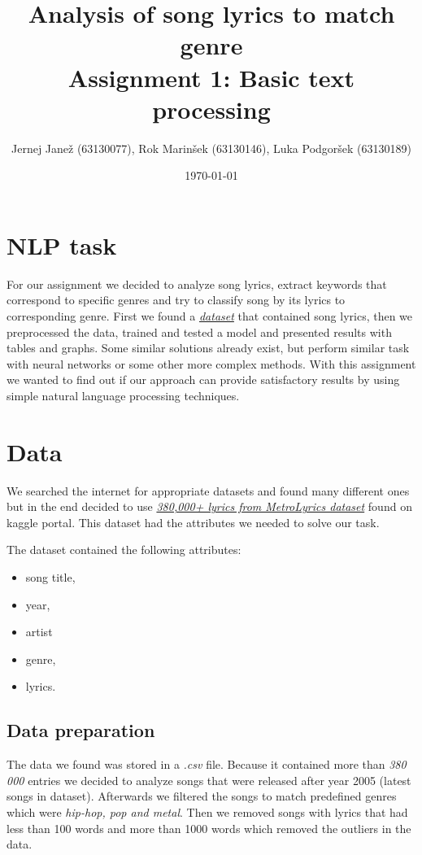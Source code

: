 \documentclass[a4paper,11pt]{article}
\title{%
Analysis of song lyrics to match genre \\
\large Assignment 1: Basic text processing}
\author{Jernej Janež (63130077), Rok Marinšek (63130146), Luka Podgoršek (63130189)}
\date{\today}
\begin{document}
\maketitle

\section{NLP task}
For our assignment we decided to analyze song lyrics, extract keywords that correspond to specific genres and try to classify song by its lyrics to corresponding genre. First we found a \href{https://www.kaggle.com/gyani95/380000-lyrics-from-metrolyrics}{\textit{dataset}} that contained song lyrics, then we preprocessed the data, trained and tested a model and presented results with tables and graphs. Some similar solutions already exist, but perform similar task with neural networks or some other more complex methods. With this assignment we wanted to find out if our approach can provide satisfactory results by using simple natural language processing techniques.

\section{Data}
We searched the internet for appropriate datasets and found many different ones but in the end decided to use \href{https://www.kaggle.com/gyani95/380000-lyrics-from-metrolyrics}{\textit{380,000+ lyrics from MetroLyrics dataset}} found on kaggle portal. This dataset had the attributes we needed to solve our task.

\noindent The dataset contained the following attributes:
\begin{itemize}
\item song title,
\item year,
\item artist
\item genre,
\item lyrics.
\end{itemize}

\subsection{Data preparation}
The data we found was stored in a \textit{.csv} file. Because it contained more than \textit{380 000} entries we decided to analyze songs that were released after year 2005 (latest songs in dataset). Afterwards we filtered the songs to match predefined genres which were \textit{hip-hop, pop and metal}. Then we removed songs with lyrics that had less than 100 words and more than 1000 words which removed the outliers in the data.
\end{document}
